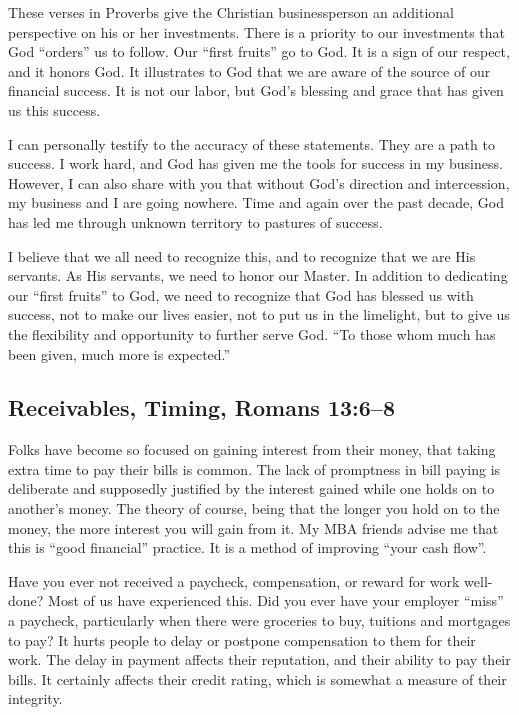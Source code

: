 \documentclass[12pt]{memoir}
\begin{document}
These verses in Proverbs give the Christian businessperson an additional
perspective on his or her investments. There is a priority to our
investments that God ``orders'' us to follow. Our ``first fruits''
go to God. It is a sign of our respect, and it honors God. It illustrates
to God that we are aware of the source of our financial success. It
is not our labor, but God's blessing and grace that has given us this
success. 

I can personally testify to the accuracy of these statements. They
are a path to success. I work hard, and God has given me the tools
for success in my business. However, I can also share with you that
without God's direction and intercession, my business and I are going
nowhere. Time and again over the past decade, God has led me through
unknown territory to pastures of success. 

I believe that we all need to recognize this, and to recognize that
we are His servants. As His servants, we need to honor our Master.
In addition to dedicating our ``first fruits'' to God, we need to
recognize that God has blessed us with success, not to make our lives
easier, not to put us in the limelight, but to give us the flexibility
and opportunity to further serve God. ``To those whom much has been
given, much more is expected.''

\subsection{Receivables, Timing, Romans 13:6--8}

Folks have become so focused on gaining interest from their money,
that taking extra time to pay their bills is common. The lack of promptness
in bill paying is deliberate and supposedly justified by the interest
gained while one holds on to another's money. The theory of course,
being that the longer you hold on to the money, the more interest
you will gain from it. My MBA friends advise me that this is ``good
financial'' practice. It is a method of improving ``your cash flow''. 

Have you ever not received a paycheck, compensation, or reward for
work well-done? Most of us have experienced this. Did you ever have
your employer ``miss'' a paycheck, particularly when there were
groceries to buy, tuitions and mortgages to pay? It hurts people to
delay or postpone compensation to them for their work. The delay in
payment affects their reputation, and their ability to pay their bills.
It certainly affects their credit rating, which is somewhat a measure
of their integrity.
\end{document}

